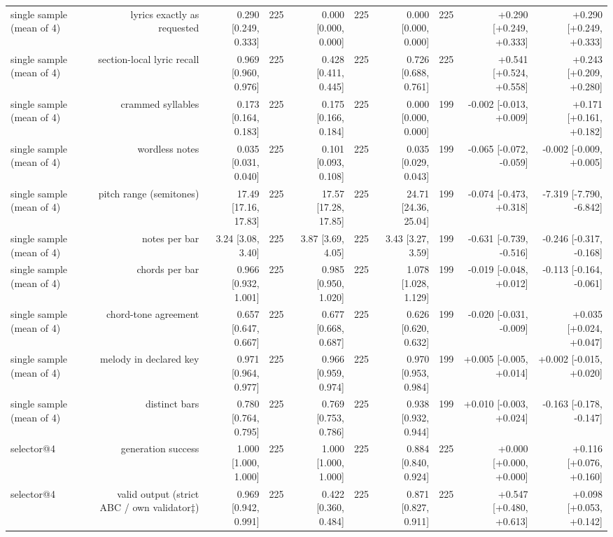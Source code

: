 \begin{table}[t]
\begin{tabular}{lrrrrrrrrr}
single sample (mean of 4) & lyrics exactly as requested & 0.290 [0.249, 0.333] & 225 & 0.000 [0.000, 0.000] & 225 & 0.000 [0.000, 0.000] & 225 & +0.290 [+0.249, +0.333] & +0.290 [+0.249, +0.333] \\
single sample (mean of 4) & section-local lyric recall & 0.969 [0.960, 0.976] & 225 & 0.428 [0.411, 0.445] & 225 & 0.726 [0.688, 0.761] & 225 & +0.541 [+0.524, +0.558] & +0.243 [+0.209, +0.280] \\
single sample (mean of 4) & crammed syllables & 0.173 [0.164, 0.183] & 225 & 0.175 [0.166, 0.184] & 225 & 0.000 [0.000, 0.000] & 199 & -0.002 [-0.013, +0.009] & +0.171 [+0.161, +0.182] \\
single sample (mean of 4) & wordless notes & 0.035 [0.031, 0.040] & 225 & 0.101 [0.093, 0.108] & 225 & 0.035 [0.029, 0.043] & 199 & -0.065 [-0.072, -0.059] & -0.002 [-0.009, +0.005] \\
single sample (mean of 4) & pitch range (semitones) & 17.49 [17.16, 17.83] & 225 & 17.57 [17.28, 17.85] & 225 & 24.71 [24.36, 25.04] & 199 & -0.074 [-0.473, +0.318] & -7.319 [-7.790, -6.842] \\
single sample (mean of 4) & notes per bar & 3.24 [3.08, 3.40] & 225 & 3.87 [3.69, 4.05] & 225 & 3.43 [3.27, 3.59] & 199 & -0.631 [-0.739, -0.516] & -0.246 [-0.317, -0.168] \\
single sample (mean of 4) & chords per bar & 0.966 [0.932, 1.001] & 225 & 0.985 [0.950, 1.020] & 225 & 1.078 [1.028, 1.129] & 199 & -0.019 [-0.048, +0.012] & -0.113 [-0.164, -0.061] \\
single sample (mean of 4) & chord-tone agreement & 0.657 [0.647, 0.667] & 225 & 0.677 [0.668, 0.687] & 225 & 0.626 [0.620, 0.632] & 199 & -0.020 [-0.031, -0.009] & +0.035 [+0.024, +0.047] \\
single sample (mean of 4) & melody in declared key & 0.971 [0.964, 0.977] & 225 & 0.966 [0.959, 0.974] & 225 & 0.970 [0.953, 0.984] & 199 & +0.005 [-0.005, +0.014] & +0.002 [-0.015, +0.020] \\
single sample (mean of 4) & distinct bars & 0.780 [0.764, 0.795] & 225 & 0.769 [0.753, 0.786] & 225 & 0.938 [0.932, 0.944] & 199 & +0.010 [-0.003, +0.024] & -0.163 [-0.178, -0.147] \\
selector@4 & generation success & 1.000 [1.000, 1.000] & 225 & 1.000 [1.000, 1.000] & 225 & 0.884 [0.840, 0.924] & 225 & +0.000 [+0.000, +0.000] & +0.116 [+0.076, +0.160] \\
selector@4 & valid output (strict ABC / own validator‡) & 0.969 [0.942, 0.991] & 225 & 0.422 [0.360, 0.484] & 225 & 0.871 [0.827, 0.911] & 225 & +0.547 [+0.480, +0.613] & +0.098 [+0.053, +0.142] \\

\end{tabular}
\end{table}
